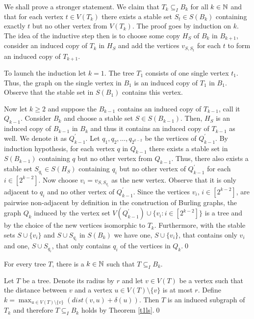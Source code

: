 \begin{prf}
We shall prove a stronger statement. We claim that $T_k\subseteq_I B_k$ for all $k\in\mathbb{N}$ and that for each vertex $t\in V(T_k)$ there exists a stable set $S_t\in S(B_k)$ containing exactly $t$ but no other vertex from $V(T_k)$. The proof goes by induction on $k$. The idea of the inductive step then is to choose some copy $H_S$ of $B_k$ in $B_{k+1}$, consider an induced copy of $T_k$ in $H_S$ and add the vertices $v_{S,S_t}$ for each $t$ to form an induced copy of $T_{k+1}$.

To launch the induction let $k=1$. The tree $T_1$ consists of one single vertex $t_1$. Thus, the graph on the single vertex in $B_1$ is an induced copy of $T_1$ in $B_1$. Observe that the stable set in $S(B_1)$ contains this vertex.

Now let $k\geq 2$ and suppose the $B_{k-1}$ contains an induced copy of $T_{k-1}$, call it $Q_{k-1}$. Consider $B_k$ and choose a stable set $S\in S(B_{k-1})$. Then, $H_S$ is an induced copy of $B_{k-1}$ in $B_k$ and thus it contains an induced copy of $T_{k-1}$ as well. We denote it as $Q_{k-1}^\prime$. Let $q_1, q_2,\dots , q_{2^{k-2}}$ be the vertices of $Q_{k-1}^\prime$. By induction hypothesis, for each vertex $q$ in $Q_{k-1}$ there exists a stable set in $S(B_{k-1})$ containing $q$ but no other vertex from $Q_{k-1}$. Thus, there also exists a stable set $S_{q_i}\in S(H_S)$ containing $q_i$ but no other vertex of $Q_{k-1}^\prime$ for each $i\in [2^{k-2}]$. Now choose $v_i=v_{S,S_{q_i}}$ as the new vertex. Observe that it is only adjacent to $q_i$ and no other vertex of $Q_{k-1}^\prime$. Since the vertices $v_i$, $i\in [2^{k-2}]$, are pairwise non-adjacent by definition in the construction of Burling graphs, the graph $Q_k$ induced by the vertex set $V(Q_{k-1}^\prime)\cup \lbrace v_i:i\in [2^{k-2}]\rbrace$ is a tree and by the choice of the new vertices isomorphic to $T_k$. Furthermore, with the stable sets $S\cup \lbrace v_i\rbrace$ and $S\cup S_{q_i}$ in $S(B_k)$ we have one, $S\cup \lbrace v_i\rbrace$, that contains only $v_i$ and one, $S\cup S_{q_i}$, that only contains $q_i$ of the vertices in $Q_k$.\qed
\end{prf}

\begin{cor}
For every tree $T$, there is a $k\in\mathbb{N}$ such that $T\subseteq_I B_k$.
\end{cor}
\begin{prf}
Let $T$ be a tree. Denote its radius by $r$ and let $v\in V(T)$ be a vertex such that the distance between $v$ and a vertex $u\in V(T)\setminus \lbrace v\rbrace$ is at most $r$. Define $k=\max_{u\in V(T)\setminus \lbrace v\rbrace} (dist(v,u)+\delta (u))$. Then $T$ is an induced subgraph of $T_k$ and therefore $T\subseteq_I B_k$ holds by Theorem \ref{t1ls}.\qed
\end{prf}


